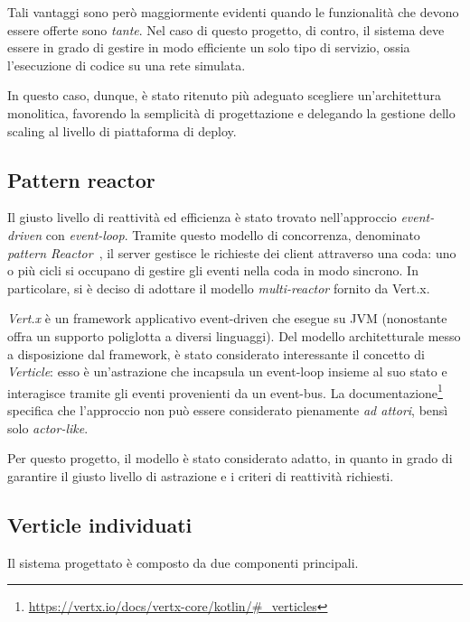     Tali vantaggi sono però maggiormente evidenti quando le funzionalità che devono essere offerte sono \emph{tante}.
    Nel caso di questo progetto, di contro, il sistema deve essere in grado di gestire in modo efficiente un solo tipo di servizio, ossia l'esecuzione di codice su una rete simulata.

    In questo caso, dunque, è stato ritenuto più adeguato scegliere un'architettura monolitica, favorendo la semplicità di progettazione
    e delegando la gestione dello scaling al livello di piattaforma di deploy.

    \subsection{Pattern reactor}\label{subsec:reactor}

      Il giusto livello di reattività ed efficienza è stato trovato nell'approccio \emph{event-driven} con \emph{event-loop}.
      Tramite questo modello di concorrenza, denominato \emph{pattern Reactor}~\cite{Schmidt1995ReactorAO}, il server gestisce le richieste dei client attraverso una coda:
      uno o più cicli si occupano di gestire gli eventi nella coda in modo sincrono.
      In particolare, si è deciso di adottare il modello \emph{multi-reactor} fornito da Vert.x.

      \emph{Vert.x} è un framework applicativo event-driven che esegue su JVM (nonostante offra un supporto poliglotta a diversi linguaggi).
      Del modello architetturale messo a disposizione dal framework, è stato considerato interessante il concetto di \emph{Verticle}:
      esso è un'astrazione che incapsula un event-loop insieme al suo stato e interagisce tramite gli eventi provenienti da un event-bus.
      La documentazione\footnote{\url{https://vertx.io/docs/vertx-core/kotlin/\#_verticles}} %
      specifica che l'approccio non può essere considerato pienamente \emph{ad attori}, bensì solo \emph{actor-like}.

      Per questo progetto, il modello è stato considerato adatto, in quanto in grado di garantire il giusto livello di astrazione e i criteri di reattività richiesti.

    \subsection{Verticle individuati}
      Il sistema progettato è composto da due componenti principali.

